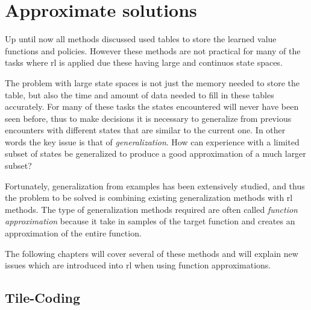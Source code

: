 \chapter{Approximate solutions}

Up until now all methods discussed used tables to store the learned value functions and policies. However these methods are not practical for many of the tasks where \acrfull{rl} is applied due these having large and continuos state spaces. 

The problem with large state spaces is not just the memory needed to store the table, but also the time and amount of data needed to fill in these tables accurately. For many of these tasks the states encountered will never have been seen before, thus to make decisions it is necessary to generalize from previous encounters with different states that are similar to the current one. In other words the key issue is that of \emph{generalization}. How can experience with a limited subset of states be generalized to produce a good approximation of a much larger subset?

Fortunately, generalization from examples has been extensively studied, and thus the problem to be solved is combining existing generalization methods with \gls{rl} methods. The type of generalization methods required are often called \emph{function approximation} because it take in samples of the target function and creates an approximation of the entire function.

The following chapters will cover several of these methods and will explain new issues which are introduced into \gls{rl} when using function approximations.

\section{Tile-Coding}

